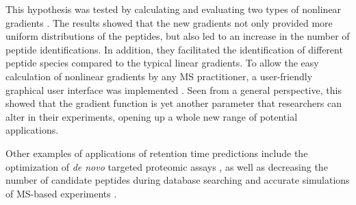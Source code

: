 \documentclass[a4paper]{article}
\begin{document}
This hypothesis was tested by calculating and evaluating two types of
nonlinear gradients \cite{gradopt1}. The results showed that the new
gradients not only provided more uniform distributions of the
peptides, but also led to an increase in the number of peptide
identifications. In addition, they facilitated the identification of
different peptide species compared to the typical linear gradients. To
allow the easy calculation of nonlinear gradients by any MS
practitioner, a user-friendly graphical user interface was implemented 
\cite{gradopt2}.  Seen from a general perspective, this showed that
the gradient function is yet another parameter that researchers can
alter in their experiments, opening up a whole new range of potential
applications.

Other examples of applications of retention time predictions include
the optimization of {\em de novo} targeted proteomic assays
\cite{bertsch2010}, as well as decreasing the number of candidate
peptides during database searching \cite{lobas2013} and accurate
simulations of MS-based experiments \cite{bielow2011}.



 

\end{document}
